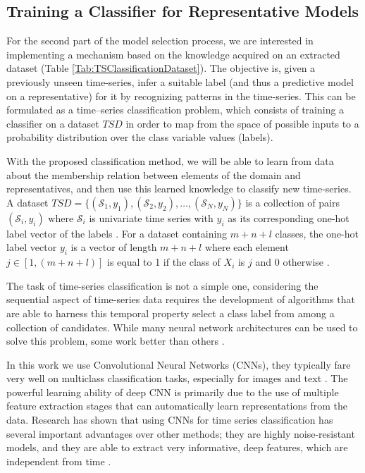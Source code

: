 \subsection{Training a Classifier for Representative Models}
\label{Sec:TrainingClassifier}
For the second part of the model selection process, we are interested in implementing a mechanism based on the knowledge acquired on an extracted dataset (Table \ref{Tab:TSClassificationDataset}). The objective is, given a previously unseen time-series, infer a suitable label (and thus a predictive model on a representative) for it by recognizing patterns in the time-series. This can be formulated as a time--series classification problem, which consists of training a classifier on a dataset $TSD$ in order to map from the space of possible inputs to a probability distribution over the class variable values (labels). 

With the proposed classification method, we will be able to learn from data about the membership relation between elements of the domain and representatives, and then use this learned knowledge to classify new time-series. A dataset $TSD=\{(\mathcal{S}_1,y_1),(\mathcal{S}_2,y_2), \ldots ,(\mathcal{S}_N,y_N)\}$ is a collection of pairs $(\mathcal{S}_i,y_i)$ where $\mathcal{S}_i$ is univariate time series with $y_i$ as its corresponding one-hot label vector of the labels \cite{Gulli2017}. For a dataset containing $m+n+l$ classes, the one-hot label vector $y_i$ is a vector of length $m+n+l$ where each element $j \in [1,(m+n+l)]$ is equal to 1 if the class of $X_i$ is $j$ and $0$ otherwise \cite{Mitsa2010}.

The task of time-series classification is not a simple one, considering the sequential aspect of time-series data requires the development of algorithms that are able to harness this temporal property select a class label from among a collection of candidates. While many neural network architectures can be used to solve this problem, some work better than others \cite{Bagnall2017a}. 

In this work we use Convolutional Neural Networks (CNNs), they typically fare very well on multiclass classification tasks, especially for images and text \cite{Goodfellow2016}. The powerful learning ability of deep CNN is primarily due to the use of multiple feature extraction stages that can automatically learn representations from the data. Research has shown that using CNNs for time series classification has several important advantages over other methods; they are highly noise-resistant models, and they are able to extract very informative, deep features, which are independent from time \cite{Wang2016, Bagnall2017a, Zhao2017}.

